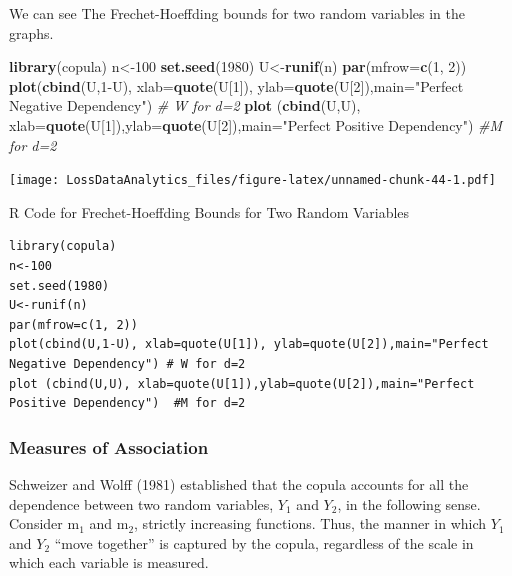 \documentclass[]{book}
\newenvironment{Shaded}{\begin{snugshade}}{\end{snugshade}}
\newcommand{\KeywordTok}[1]{\textcolor[rgb]{0.13,0.29,0.53}{\textbf{{#1}}}}
\newcommand{\DataTypeTok}[1]{\textcolor[rgb]{0.13,0.29,0.53}{{#1}}}
\newcommand{\DecValTok}[1]{\textcolor[rgb]{0.00,0.00,0.81}{{#1}}}
\newcommand{\StringTok}[1]{\textcolor[rgb]{0.31,0.60,0.02}{{#1}}}
\newcommand{\CommentTok}[1]{\textcolor[rgb]{0.56,0.35,0.01}{\textit{{#1}}}}
\newcommand{\NormalTok}[1]{{#1}}
\theoremstyle{definition}
\theoremstyle{definition}
\theoremstyle{definition}
\theoremstyle{remark}
\begin{document}
We can see The Frechet-Hoeffding bounds for two random variables in the
graphs.

\begin{Shaded}
\begin{Highlighting}[]
\KeywordTok{library}\NormalTok{(copula)}
\NormalTok{n<-}\DecValTok{100}
\KeywordTok{set.seed}\NormalTok{(}\DecValTok{1980}\NormalTok{)}
\NormalTok{U<-}\KeywordTok{runif}\NormalTok{(n)}
\KeywordTok{par}\NormalTok{(}\DataTypeTok{mfrow=}\KeywordTok{c}\NormalTok{(}\DecValTok{1}\NormalTok{, }\DecValTok{2}\NormalTok{))}
\KeywordTok{plot}\NormalTok{(}\KeywordTok{cbind}\NormalTok{(U,}\DecValTok{1}\NormalTok{-U), }\DataTypeTok{xlab=}\KeywordTok{quote}\NormalTok{(U[}\DecValTok{1}\NormalTok{]), }\DataTypeTok{ylab=}\KeywordTok{quote}\NormalTok{(U[}\DecValTok{2}\NormalTok{]),}\DataTypeTok{main=}\StringTok{"Perfect Negative Dependency"}\NormalTok{) }\CommentTok{# W for d=2}
\KeywordTok{plot} \NormalTok{(}\KeywordTok{cbind}\NormalTok{(U,U), }\DataTypeTok{xlab=}\KeywordTok{quote}\NormalTok{(U[}\DecValTok{1}\NormalTok{]),}\DataTypeTok{ylab=}\KeywordTok{quote}\NormalTok{(U[}\DecValTok{2}\NormalTok{]),}\DataTypeTok{main=}\StringTok{"Perfect Positive Dependency"}\NormalTok{)  }\CommentTok{#M for d=2}
\end{Highlighting}
\end{Shaded}

\texttt{[image: LossDataAnalytics\_files/figure-latex/unnamed-chunk-44-1.pdf]}

R Code for Frechet-Hoeffding Bounds for Two Random Variables

\hypertarget{display.plot.2}{}
\begin{verbatim}
library(copula)
n<-100
set.seed(1980)
U<-runif(n)
par(mfrow=c(1, 2))
plot(cbind(U,1-U), xlab=quote(U[1]), ylab=quote(U[2]),main="Perfect Negative Dependency") # W for d=2
plot (cbind(U,U), xlab=quote(U[1]),ylab=quote(U[2]),main="Perfect Positive Dependency")  #M for d=2
\end{verbatim}

\subsubsection{Measures of Association}\label{measures-of-association}

Schweizer and Wolff (1981) established that the copula accounts for all
the dependence between two random variables, \(Y_1\) and \(Y_2\), in the
following sense. Consider m\(_1\) and m\(_2\), strictly increasing
functions. Thus, the manner in which \(Y_1\) and \(Y_2\) ``move
together'' is captured by the copula, regardless of the scale in which
each variable is measured.
\end{document}
